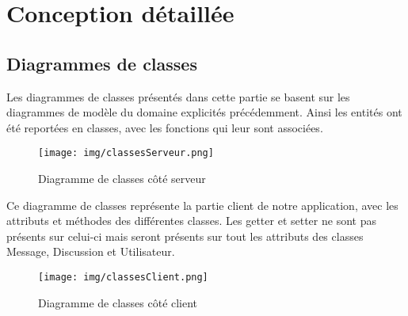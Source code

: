 \section{Conception détaillée}

	\subsection{Diagrammes de classes}
	Les diagrammes de classes présentés dans cette partie se basent sur les diagrammes de modèle du domaine explicités précédemment.
	Ainsi les entités ont été reportées en classes, avec les fonctions qui leur sont associées.
	\begin{figure}[H]
		\centerline{\texttt{[image: img/classesServeur.png]}}
		\caption{Diagramme de classes côté serveur}
	\end{figure}

	\newpage

	Ce diagramme de classes représente la partie client de notre application, avec les attributs et méthodes des différentes classes.
	Les getter et setter ne sont pas présents sur celui-ci mais seront présents sur tout les attributs des classes Message, Discussion et Utilisateur.
	\begin{figure}[H]
		\centerline{\texttt{[image: img/classesClient.png]}}
		\caption{Diagramme de classes côté client}
	\end{figure}


